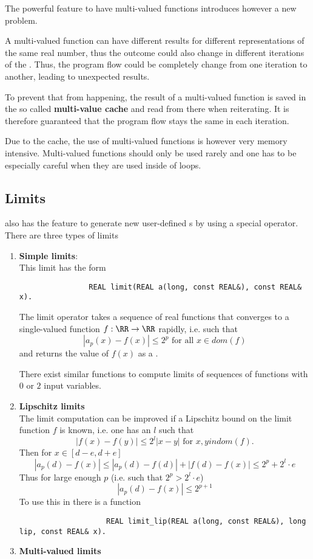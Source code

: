 		The powerful feature to have multi-valued functions introduces however a
    new problem.

		A multi-valued function can have different results for different representations of the same real number,
		thus the outcome could also change in different iterations of the \irram. 
		Thus, the program flow could be completely change from one iteration to another, leading to unexpected results.

		To prevent that from happening, the result of a multi-valued function is saved in the so called \textbf{multi-value cache}
		and read from there when reiterating. 
		It is therefore guaranteed that the program flow stays the same in each iteration.
		
    Due to the cache, the use of multi-valued functions is however very memory
    intensive.
    Multi-valued functions should only be used rarely and one has to be
    especially careful when they are used inside of loops.
	\subsection{Limits}
		\irram also has the feature to generate new user-defined {\real}s by using a special  operator.
		There are three types of limits
		\begin{enumerate}
			\item \textbf{Simple limits}: \\
			This limit has the form
			\begin{verbatim}
				REAL limit(REAL a(long, const REAL&), const REAL& x).
			\end{verbatim}

			The limit operator takes a sequence of real functions that converges to a single-valued function $f: \RR \to \RR$
			rapidly, i.e. such that 
			$$|a_p(x) - f(x)| \leq 2^p \text{ for all } x \in dom(f)$$
			and returns the value of $f(x)$ as a \real.

			There exist similar functions to compute limits of sequences of functions with $0$ or $2$ input variables.
			\item \textbf{Lipschitz limits} \\
				The limit computation can be improved if a Lipschitz bound on the limit function $f$ is known, i.e. one has an $l$
				such that
				\begin{equation*}
					| f(x) - f(y) | \leq 2^l | x - y | \text{ for } x,y in dom(f).
				\end{equation*}
				Then for $x \in [d-e, d+e]$  
				$$ | a_p(d) - f(x) | \leq | a_p(d) - f(d) | + | f(d) - f(x) |  \leq 2^p + 2^l \cdot e $$
				Thus for large enough $p$ (i.e. such that $2^p > 2^l \cdot e$)
				$$ | a_p(d) - f(x) | \leq  2^{p+1} $$
				To use this in \irram there is a function
				\begin{verbatim}
					REAL limit_lip(REAL a(long, const REAL&), long lip, const REAL& x).
				\end{verbatim}
			\item \textbf{Multi-valued limits}
		\end{enumerate}
